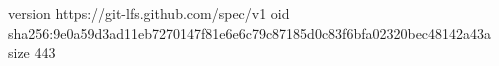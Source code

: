 version https://git-lfs.github.com/spec/v1
oid sha256:9e0a59d3ad11eb7270147f81e6e6c79c87185d0c83f6bfa02320bec48142a43a
size 443
